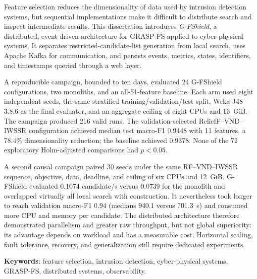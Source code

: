 \begin{resumo}[Abstract]

Feature selection reduces the dimensionality of data used by intrusion detection systems, but sequential implementations make it difficult to distribute search and inspect intermediate results. This dissertation introduces \textit{G-FShield}, a distributed, event-driven architecture for GRASP-FS applied to cyber-physical systems. It separates restricted-candidate-list generation from local search, uses Apache Kafka for communication, and persists events, metrics, states, identifiers, and timestamps queried through a web layer.

A reproducible campaign, bounded to ten days, evaluated 24 G-FShield configurations, two monoliths, and an all-51-feature baseline. Each arm used eight independent seeds, the same stratified training/validation/test split, Weka J48 3.8.6 as the final evaluator, and an aggregate ceiling of eight CPUs and 16~GiB. The campaign produced 216 valid runs. The validation-selected ReliefF--VND--IWSSR configuration achieved median test macro-F1 0.9448 with 11 features, a 78.4\% dimensionality reduction; the baseline achieved 0.9378. None of the 72 exploratory Holm-adjusted comparisons had $p<0.05$.

A second causal campaign paired 30 seeds under the same RF--VND--IWSSR sequence, objective, data, deadline, and ceiling of six CPUs and 12~GiB. G-FShield evaluated 0.1074 candidate/s versus 0.0739 for the monolith and overlapped virtually all local search with construction. It nevertheless took longer to reach validation macro-F1 0.94 (medians 940.1 versus 701.3~s) and consumed more CPU and memory per candidate. The distributed architecture therefore demonstrated parallelism and greater raw throughput, but not global superiority: its advantage depends on workload and has a measurable cost. Horizontal scaling, fault tolerance, recovery, and generalization still require dedicated experiments.

\noindent
\textbf{Keywords}: feature selection, intrusion detection, cyber-physical systems, GRASP-FS, distributed systems, observability.

\end{resumo}
